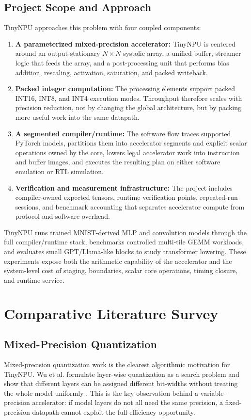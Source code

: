 \documentclass[a4paper, 12pt, titlepage]{article}
\begin{document}
\subsection{Project Scope and Approach}
TinyNPU approaches this problem with four coupled components:
\begin{enumerate}
    \item \textbf{A parameterized mixed-precision accelerator:} TinyNPU is centered around an output-stationary $N \times N$ systolic array, a unified buffer, streamer logic that feeds the array, and a post-processing unit that performs bias addition, rescaling, activation, saturation, and packed writeback.
    \item \textbf{Packed integer computation:} The processing elements support packed INT16, INT8, and INT4 execution modes. Throughput therefore scales with precision reduction, not by changing the global architecture, but by packing more useful work into the same datapath.
    \item \textbf{A segmented compiler/runtime:} The software flow traces supported PyTorch models, partitions them into accelerator segments and explicit scalar operations owned by the core, lowers legal accelerator work into instruction and buffer images, and executes the resulting plan on either software emulation or RTL simulation.
    \item \textbf{Verification and measurement infrastructure:} The project includes compiler-owned expected tensors, runtime verification points, repeated-run sessions, and benchmark accounting that separates accelerator compute from protocol and software overhead.
\end{enumerate}

TinyNPU runs trained MNIST-derived MLP and convolution models through the full compiler/runtime stack, benchmarks controlled multi-tile GEMM workloads, and evaluates small GPT/Llama-like blocks to study transformer lowering. These experiments expose both the arithmetic capability of the accelerator and the system-level cost of staging, boundaries, scalar core operations, timing closure, and runtime service.
\newpage

\section{Comparative Literature Survey}
\subsection{Mixed-Precision Quantization}
Mixed-precision quantization work is the clearest algorithmic motivation for TinyNPU. Wu et al. formulate layer-wise quantization as a search problem and show that different layers can be assigned different bit-widths without treating the whole model uniformly \cite{wu2018mixedprecision}. This is the key observation behind a variable-precision accelerator: if model layers do not all need the same precision, a fixed-precision datapath cannot exploit the full efficiency opportunity.
\end{document}
